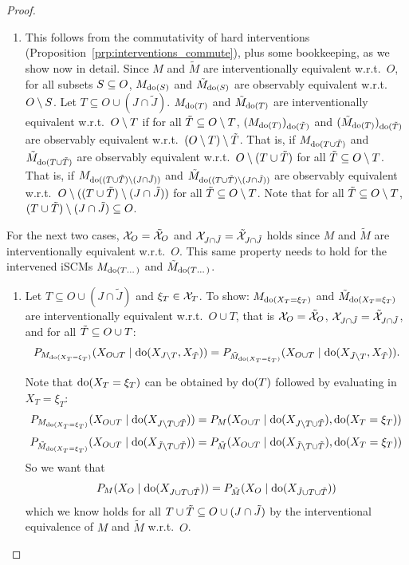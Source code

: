 \begin{proof}
  \begin{enumerate}
    \item This follows from the commutativity of hard interventions (Proposition~\ref{prp:interventions_commute}), plus some bookkeeping, as we show now in detail.
  Since $M$ and $\tilde{M}$ are interventionally equivalent w.r.t.\ $O$,
  for all subsets $S \subseteq O$, $M_{\operatorname{do}(S)}$ and $\tilde{M}_{\operatorname{do}(S)}$ are observably equivalent w.r.t.\ $O \setminus S$.
  Let $T \subseteq O \cup (J \cap \tilde{J})$.
  $M_{\operatorname{do}(T)}$ and $\tilde{M}_{\operatorname{do}(T)}$ are interventionally equivalent w.r.t.\ $O\setminus T$ if for all $\tilde{T} \subseteq O\setminus T$,
  $(M_{\operatorname{do}(T)})_{\operatorname{do}(\tilde{T})}$ and $(\tilde{M}_{\operatorname{do}(T)})_{\operatorname{do}(\tilde{T})}$ are observably equivalent w.r.t.\ $(O\setminus T) \setminus \tilde{T}$.
  That is, if $M_{\operatorname{do}(T \cup \tilde{T})}$ and $\tilde{M}_{\operatorname{do}(T \cup \tilde{T})}$ are observably equivalent w.r.t.\ $O \setminus (T \cup \tilde{T})$ for all $\tilde{T} \subseteq O\setminus T$.
  That is, if $M_{\operatorname{do}((T \cup \tilde{T}) \setminus (J \cap \tilde{J}))}$ and $\tilde{M}_{\operatorname{do}((T \cup \tilde{T}) \setminus (J \cap \tilde{J}))}$ are observably equivalent w.r.t.\ $O \setminus ((T \cup \tilde{T}) \setminus (J \cap \tilde{J}))$ for all $\tilde{T} \subseteq O\setminus T$.
  Note that for all $\tilde{T} \subseteq O\setminus T$, $(T \cup \tilde{T}) \setminus (J \cap \tilde{J}) \subseteq O$.
  \end{enumerate}

  For the next two cases, $\mathcal{X}_O = \tilde{\mathcal{X}}_O$ and $\mathcal{X}_{J \cap \tilde{J}} = \tilde{\mathcal{X}}_{J \cap \tilde{J}}$ holds since
  $M$ and $\tilde{M}$ are interventionally equivalent w.r.t.\ $O$. 
  This same property needs to hold for the intervened iSCMs $M_{\operatorname{do}(T\dots)}$ and $\tilde{M}_{\operatorname{do}(T\dots)}$.

\begin{enumerate}[resume*]
\item
  Let $T \subseteq O \cup (J \cap \tilde{J})$ and $\xi_T \in \mathcal{X}_T$.
  To show: $M_{\operatorname{do}(X_T=\xi_T)}$ and $\tilde{M}_{\operatorname{do}(X_T=\xi_T)}$ are interventionally equivalent w.r.t.\ $O \cup T$, that is
  $\mathcal{X}_O = \tilde{\mathcal{X}}_O$, $\mathcal{X}_{J \cap \tilde{J}} = \tilde{\mathcal{X}}_{J \cap \tilde{J}}$, and for all $\tilde{T} \subseteq O \cup T$:
  $$P_{M_{\operatorname{do}(X_T=\xi_T)}}(X_{O \cup T} \mid \operatorname{do}(X_{J\setminus T},X_{\tilde{T}})) = P_{\tilde{M}_{\operatorname{do}(X_T=\xi_T)}}(X_{O\cup T} \mid \operatorname{do}(X_{\tilde J \setminus T},X_{\tilde{T}})).$$

  Note that $\operatorname{do}(X_T=\xi_T)$ can be obtained by $\operatorname{do}(T)$ followed by evaluating in $X_T=\xi_T$:
      $$P_{M_{\operatorname{do}(X_T=\xi_T)}}(X_{O \cup T} \mid \operatorname{do}(X_{J\setminus T \cup \tilde{T}})) = P_M(X_{O \cup T} \mid \operatorname{do}(X_{J \setminus T \cup \tilde{T}}),\operatorname{do}(X_T=\xi_T))$$
      $$P_{\tilde{M}_{\operatorname{do}(X_T=\xi_T)}}(X_{O \cup T} \mid \operatorname{do}(X_{\tilde{J}\setminus T\cup \tilde{T}})) = P_{\tilde{M}}(X_{O \cup T} \mid \operatorname{do}(X_{\tilde{J} \setminus T \cup \tilde{T}}),\operatorname{do}(X_T=\xi_T))$$
  So we want that
  $$P_M(X_{O} \mid \operatorname{do}(X_{J \cup T \cup \tilde{T}})) = P_{\tilde{M}}(X_{O} \mid \operatorname{do}(X_{\tilde{J} \cup T \cup \tilde{T}}))$$
  which we know holds for all $T \cup \tilde{T} \subseteq O \cup (J \cap \tilde{J})$ by the interventional equivalence of $M$ and $\tilde{M}$ w.r.t.\ $O$.


\end{enumerate}
\end{proof}
